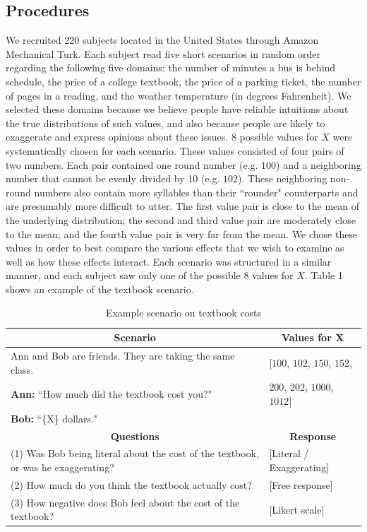 \documentclass{article} %
\begin{document}
\subsection{Procedures}

We recruited $220$ subjects located in the United States through Amazon Mechanical Turk. Each subject read five short scenarios in random order regarding the following five domains: the number of minutes a bus is behind schedule, the price of a college textbook, the price of a parking ticket, the number of pages in a reading, and the weather temperature (in degrees Fahrenheit). We selected these domains because we believe people have reliable intuitions about the true distributions of such values, and also because people are likely to exaggerate and express opinions about these issues. $8$ possible values for $X$ were systematically chosen for each scenario. These values consisted of four pairs of two numbers. Each pair contained one round number (e.g. $100$) and a neighboring number that cannot be evenly divided by 10 (e.g. $102$). These neighboring non-round numbers also contain more syllables than their ``rounder" counterparts and are presumably more difficult to utter. The first value pair is close to the mean of the underlying distribution; the second and third value pair are moderately close to the mean; and the fourth value pair is very far from the mean. We chose these values in order to best compare the various effects that we wish to examine as well as how these effects interact. Each scenario was structured in a similar manner, and each subject saw only one of the possible $8$ values for $X$. Table 1 shows an example of the textbook scenario.
\begin{table}[h]
\begin{tabular}{| p{9.7cm}| l |}\hline
\multicolumn{1}{|c|}{\textbf{Scenario}} & \multicolumn{1}{|c|}{\textbf{Values for X}} \\\hline
\multicolumn{1}{|l|}{Ann and Bob are friends. They are taking the same class.} & \multicolumn{1}{|l|}{[$100$, $102$, $150$, $152$,}\\
\multicolumn{1}{|l|}{\textbf{Ann:} ``How much did the textbook cost you?"} & \multicolumn{1}{|l|}{$200$, $202$, $1000$, $1012$]}\\
\multicolumn{1}{|l|}{\textbf{Bob:} ``\{X\} dollars."} & \multicolumn{1}{|l|}{}\\\hline
\multicolumn{1}{|c|}{\textbf{Questions}} & \multicolumn{1}{|c|}{\textbf{Response}} \\\hline
(1) Was Bob being literal about the cost of the textbook, or was he exaggerating? & [Literal / Exaggerating] \\
(2) How much do you think the textbook actually cost? & [Free response] \\
(3) How negative does Bob feel about the cost of the textbook? & [Likert scale]\\\hline
\end{tabular}
\caption{Example scenario on textbook costs}
\label{tab:myfirsttable}
\end{table}
\end{document}
